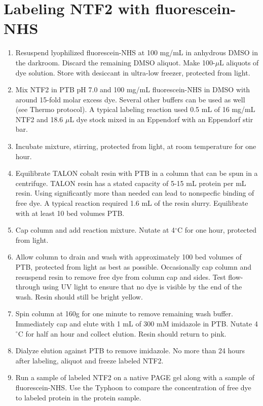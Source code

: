 \section{Labeling NTF2 with fluorescein-NHS}
\begin{enumerate}
\item Resuspend lyophilized fluorescein-NHS at 100 mg/mL in anhydrous DMSO in the darkroom.  Discard the remaining DMSO aliquot.  Make 100-$\mu$L aliquots of dye solution. Store with desiccant in ultra-low freezer, protected from light.
\item Mix NTF2 in PTB pH 7.0 and 100 mg/mL fluorescein-NHS in DMSO with around 15-fold molar excess dye.  Several other buffers can be used as well (see Thermo protocol).  A typical labeling reaction used 0.5 mL of 16 mg/mL NTF2 and 18.6 $\mu$L dye stock mixed in an Eppendorf with an Eppendorf stir bar.
\item Incubate mixture, stirring, protected from light, at room temperature for one hour.
\item Equilibrate TALON cobalt resin with PTB in a column that can be spun in a centrifuge.  TALON resin has a stated capacity of 5-15 mL protein per mL resin.  Using significantly more than needed can lead to nonspecfic binding of free dye.  A typical reaction required 1.6 mL of the resin slurry.  Equilibrate with at least 10 bed volumes PTB.
\item Cap column and add reaction mixture.  Nutate at 4$^\circ$C for one hour, protected from light.
\item Allow column to drain and wash with approximately 100 bed volumes of PTB, protected from light as best as possible.  Occasionally cap column and resuspend resin to remove free dye from column cap and sides.  Test flow-through using UV light to ensure that no dye is visible by the end of the wash.  Resin should still be bright yellow.
\item Spin column at 160g for one minute to remove remaining wash buffer.  Immediately cap and elute with 1 mL of 300 mM imidazole in PTB.  Nutate 4$^\circ$C for half an hour and collect elution.  Resin should return to pink.
\item Dialyze elution against PTB to remove imidazole.  No more than 24 hours after labeling, aliquot and freeze labeled NTF2.
\item Run a sample of labeled NTF2 on a native PAGE gel along with a sample of fluorescein-NHS.  Use the Typhoon to compare the concentration of free dye to labeled protein in the protein sample.
\end{enumerate}
